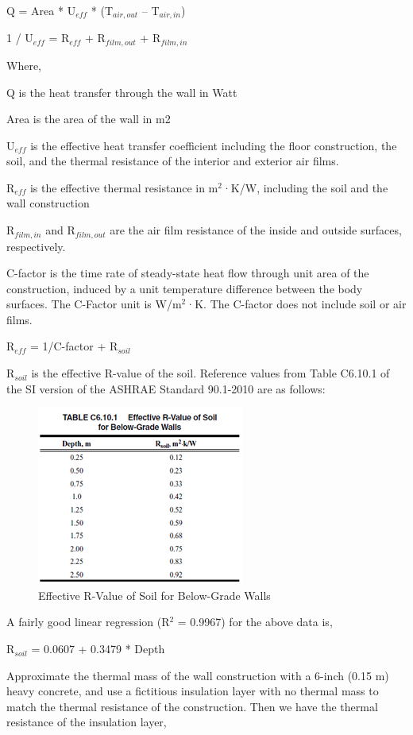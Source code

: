 Q = Area * U\(_{eff}\) * (T\(_{air,out}\) -- T\(_{air,in}\))

1 / U\(_{eff}\) = R\(_{eff}\) + R\(_{film,out}\) + R\(_{film,in}\)

Where,

Q is the heat transfer through the wall in Watt

Area is the area of the wall in m2

U\(_{eff}\) is the effective heat transfer coefficient including the floor construction, the soil, and the thermal resistance of the interior and exterior air films.

R\(_{eff}\) is the effective thermal resistance in m\(^{2}\)·K/W, including the soil and the wall construction

R\(_{film,in}\) and R\(_{film,out}\) are the air film resistance of the inside and outside surfaces, respectively.

C-factor is the time rate of steady-state heat flow through unit area of the construction, induced by a unit temperature difference between the body surfaces. The C-Factor unit is W/m\(^{2}\)·K. The C-factor does not include soil or air films.

R\(_{eff}\) = 1/C-factor + R\(_{soil}\)

R\(_{soil}\) is the effective R-value of the soil. Reference values from Table C6.10.1 of the SI version of the ASHRAE Standard 90.1-2010 are as follows:

\begin{figure}[htbp]
\centering
\includegraphics{media/image436.png}
\caption{Effective R-Value of Soil for Below-Grade Walls}
\end{figure}

A fairly good linear regression (R\(^{2}\) = 0.9967) for the above data is,

R\(_{soil}\) = 0.0607 + 0.3479 * Depth

Approximate the thermal mass of the wall construction with a 6-inch (0.15 m) heavy concrete, and use a fictitious insulation layer with no thermal mass to match the thermal resistance of the construction. Then we have the thermal resistance of the insulation layer,

